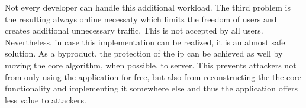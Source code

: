 Not every developer can handle this additional workload.
The third problem is the resulting always online necessaty which limits the freedom of users and creates additional unnecessary traffic.
This is not accepted by all users.
\newline
Nevertheless, in case this implementation can be realized, it is an almost safe solution.
As a byproduct, the protection of the \gls{ip} can be achieved as well by moving the core algorithm, when possible, to server.
This prevents attackers not from only using the application for free, but also from reconstructing the the core functionality and implementing it somewhere else and thus the application offers less value to attackers.
